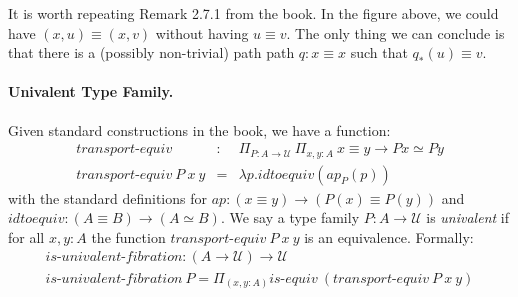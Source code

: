 \documentclass[format=acmlarge,review,natbib]{acmart}
\begin{document}
It is worth repeating Remark 2.7.1 from the book. In the figure above, we could
have $(x,u) \equiv (x,v)$ without having $u \equiv v$. The only thing we can
conclude is that there is a (possibly non-trivial) path path $q : x \equiv x$
such that $q_*(u) \equiv v$.

\paragraph*{Univalent Type Family.}
Given standard constructions in the book, we have a function:
\[\begin{array}{rcl}
\textit {transport-equiv} &:& \Pi_{P : A \to \mathcal{U}}~ \Pi_{x,y:A}~
    x \equiv y  \to P x \simeq P y \\
\textit{transport-equiv}~P~x~y &=& \lambda p. \mathit{idtoequiv}(\mathit{ap}_{P}(p))
\end{array}\]
with the standard definitions for
$\mathit{ap} : (x \equiv y) \to (P(x) \equiv P(y))$ and
$\mathit{idtoequiv} : (A \equiv B) \to (A \simeq B)$. We say a type family
$P : A \to \mathcal{U}$ is \emph{univalent} if for all $x,y:A$
the function $\textit{transport-equiv}~P~x~y$ is an equivalence. Formally:
\[\begin{array}{l}
\textit{is-univalent-fibration} : (A \to \mathcal{U}) \to \mathcal{U} \\
\textit{is-univalent-fibration}~P = \Pi_{(x,y:A)} \textit{is-equiv}~(\textit{transport-equiv}~P~x~y)
\end{array}\]
\end{document}
